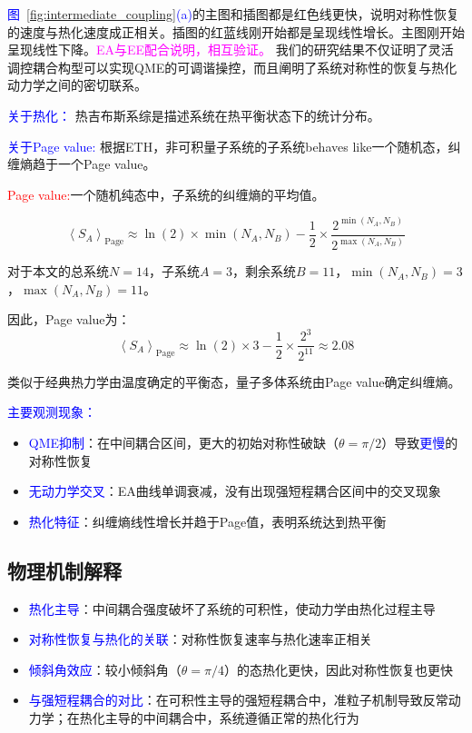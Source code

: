 \documentclass[11pt,a4paper]{article}
\begin{document}
\textcolor{blue}{图~\ref{fig:intermediate_coupling}(a)}的主图和插图都是红色线更快，说明对称性恢复的速度与热化速度成正相关。插图的红蓝线刚开始都是呈现线性增长。主图刚开始呈现线性下降。\textcolor{magenta}{EA与EE配合说明，相互验证。}
我们的研究结果不仅证明了灵活调控耦合构型可以实现QME的可调谐操控，而且阐明了系统对称性的恢复与热化动力学之间的密切联系。


\textcolor{blue}{关于热化：}
热吉布斯系综是描述系统在热平衡状态下的统计分布。

\textcolor{blue}{关于Page value:}
根据ETH，非可积量子系统的子系统behaves like一个随机态，纠缠熵趋于一个Page value。

\textcolor{red}{Page value:}一个随机纯态中，子系统的纠缠熵的平均值。

\begin{equation}
\left\langle S_A\right\rangle_{\mathrm{Page}} \approx \ln (2) \times \min \left(N_A, N_B\right)-\frac{1}{2} \times \frac{2^{\min \left(N_A, N_B\right)}}{2^{\max \left(N_A, N_B\right)}}
\end{equation}

对于本文的总系统$N=14$，子系统$A=3$，剩余系统$B=11$，$\min \left(N_A, N_B\right) = 3$，$\max \left(N_A, N_B\right) = 11$。

因此，Page value为：
\begin{equation}
\left\langle S_A\right\rangle_{\mathrm{Page}} \approx \ln (2) \times 3-\frac{1}{2} \times \frac{2^{3}}{2^{11}} \approx 2.08
\end{equation}

类似于经典热力学由温度确定的平衡态，量子多体系统由Page value确定纠缠熵。


\textcolor{blue}{主要观测现象：}
\begin{itemize}
    \item \textcolor{blue}{QME抑制}：在中间耦合区间，更大的初始对称性破缺（$\theta = \pi/2$）导致\textcolor{blue}{更慢}的对称性恢复
    \item \textcolor{blue}{无动力学交叉}：EA曲线单调衰减，没有出现强短程耦合区间中的交叉现象
    \item \textcolor{blue}{热化特征}：纠缠熵线性增长并趋于Page值，表明系统达到热平衡
\end{itemize}

\subsection{物理机制解释}
\begin{itemize}
    \item \textcolor{blue}{热化主导}：中间耦合强度破坏了系统的可积性，使动力学由热化过程主导
    \item \textcolor{blue}{对称性恢复与热化的关联}：对称性恢复速率与热化速率正相关
    \item \textcolor{blue}{倾斜角效应}：较小倾斜角（$\theta = \pi/4$）的态热化更快，因此对称性恢复也更快
    \item \textcolor{blue}{与强短程耦合的对比}：在可积性主导的强短程耦合中，准粒子机制导致反常动力学；在热化主导的中间耦合中，系统遵循正常的热化行为
\end{itemize}
\end{document}
